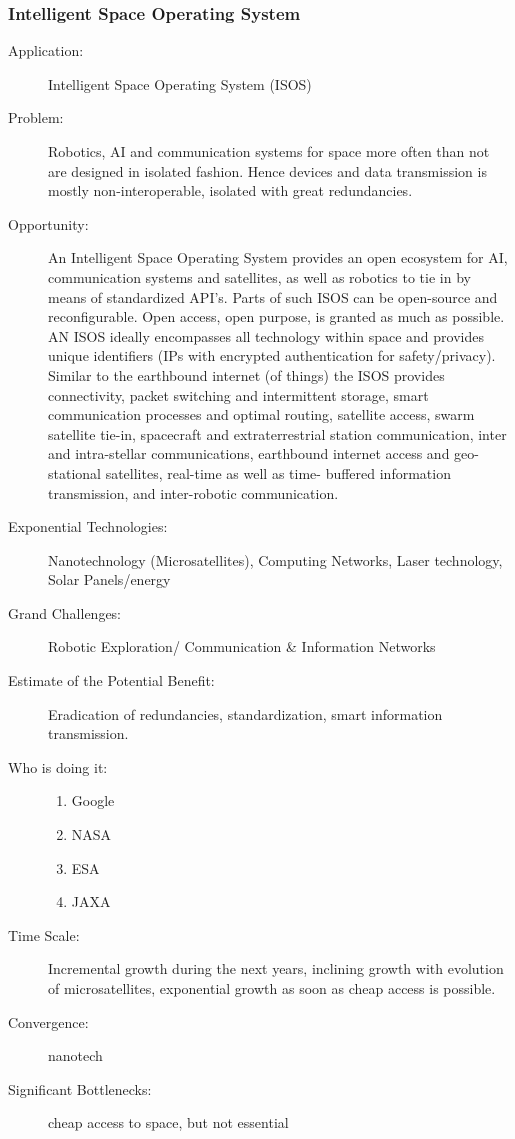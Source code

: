 \documentclass[letter,11pt]{article}
\begin{document}
\subsubsection{Intelligent Space Operating System}

\begin{description}
\item[Application:] Intelligent Space Operating System (ISOS)
   
\item[Problem:] Robotics, AI and communication systems for space more often than not are designed 
in isolated fashion. Hence devices and data transmission is mostly non-interoperable, isolated 
with great redundancies.
   
\item[Opportunity:] An Intelligent Space Operating System provides an open ecosystem for AI, 
communication systems and satellites, as well as robotics to tie in by means of standardized 
API’s. Parts of such ISOS can be open-source and reconfigurable. Open access, open purpose, is 
granted as much as possible. AN ISOS ideally encompasses all technology within space and 
provides unique identifiers (IPs with encrypted authentication for safety/privacy). Similar to the 
earthbound internet (of things) the ISOS provides connectivity, packet switching and 
intermittent storage, smart communication processes and optimal routing, satellite access, swarm 
satellite tie-in, spacecraft and extraterrestrial station communication, inter and intra-stellar 
communications, earthbound internet access and geo-stational satellites, real-time as well as time-
buffered information transmission, and inter-robotic communication. 
 
\item[Exponential Technologies:]    Nanotechnology (Microsatellites), Computing Networks, Laser 
technology, Solar Panels/energy
 
\item[Grand Challenges:] Robotic Exploration/ Communication & Information Networks
 
\item[Estimate of the Potential Benefit:]  Eradication of redundancies, standardization, smart 
information transmission.
 
\item[Who is doing it:]
\hfill\begin{enumerate}
\item Google
\item NASA
\item ESA
\item JAXA
\end{enumerate}
 
\item[Time Scale:] Incremental growth during the next years, inclining growth with evolution of 
microsatellites, exponential growth as soon as cheap access is possible.
 
\item[Convergence:] nanotech
 
\item[Significant Bottlenecks:] cheap access to space, but not essential
\end{description}
\end{document}

